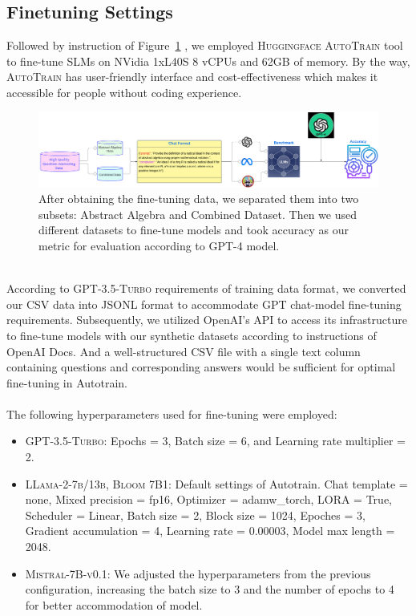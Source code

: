 \documentclass[10pt]{article}
\begin{document}
\subsection{Finetuning Settings}
  Followed by instruction of Figure~\ref{fig:Finetuning} , we employed \textsc{Huggingface AutoTrain} tool to fine-tune SLMs on NVidia 1xL40S 8 vCPUs and 62GB of memory. By the way, \textsc{AutoTrain} has user-friendly interface and cost-effectiveness which makes it accessible for people without coding experience. \\
\begin{figure}[h]
    \centering
    \includegraphics[width=\linewidth]{Figures/Finetuning Process.png}
    \caption{After obtaining the fine-tuning data, we separated them into two subsets: Abstract Algebra and Combined Dataset. Then we used different datasets to fine-tune models and took accuracy as our metric for evaluation according to \textsc{GPT-4} model.}
    \label{fig:Finetuning}
\end{figure}
\\
 
According to \textsc{GPT-3.5-Turbo} requirements of training data format, we converted our CSV data into JSONL format to accommodate GPT chat-model fine-tuning requirements. Subsequently, we utilized OpenAI's API to access its infrastructure to fine-tune models with our synthetic datasets according to instructions of OpenAI Docs. And a well-structured CSV file with a single text column containing questions and corresponding answers would be sufficient for optimal fine-tuning in Autotrain.\\
\\
 
The following hyperparameters used for fine-tuning were employed: 
\begin{itemize}
    \item  \textsc{GPT-3.5-Turbo:} Epochs = 3, Batch size = 6, and Learning rate multiplier = 2. 
    \item \textsc{LLama-2-7b/13b, Bloom 7B1}: Default settings of Autotrain. Chat template = none, Mixed precision = fp16, Optimizer = adamw\_torch, LORA = True, Scheduler = Linear, Batch size = 2, Block size = 1024, Epoches = 3, Gradient accumulation = 4, Learning rate = 0.00003, Model max length = 2048. 
    \item  \textsc{Mistral-7B-v0.1}: We adjusted the hyperparameters from the previous configuration, increasing the batch size to 3 and the number of epochs to 4 for better accommodation of model.
\end{itemize}
\end{document}
